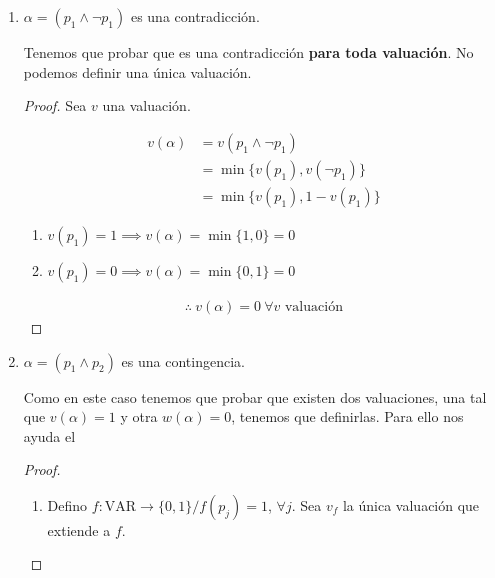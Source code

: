 \begin{enumerate}
    \item $\alpha = (p_1 \wedge \neg p_1)$ es una contradicción.

        Tenemos que probar que es una contradicción 
        \textbf{para toda valuación}. No podemos definir una única valuación.

        \begin{proof} \phantom{.}
        
            Sea $v$ una valuación.

            \begin{align*}
                v(\alpha) &= v(p_1 \wedge \neg p_1) \\
                &= \min \{ v(p_1), v(\neg p_1) \} \\
                &= \min \{ v(p_1), 1-v(p_1) \}
            \end{align*}

            \begin{enumerate}[%
                labelindent=*,
                style=multiline,
                leftmargin=*,
                align=left,
                leftmargin=2\parindent,
                label=Caso \arabic*)]
                \item $v(p_1) = 1 \implies v(\alpha) = \min \{ 1,0 \} = 0$
                \item $v(p_1) = 0 \implies v(\alpha)=\min \{ 0,1 \} = 0$
            \end{enumerate}
            \begin{gather*}
                \therefore ~ v(\alpha) = 0 ~ \forall v \text{ valuación}
            \end{gather*}
            
        \end{proof}
        
    \item $\alpha = (p_1 \wedge p_2)$ es una contingencia.

        Como en este caso tenemos que probar que existen dos valuaciones,
        una tal que $v(\alpha)=1$ y otra $w(\alpha)=0$, tenemos que 
        definirlas. Para ello nos ayuda el 


        \begin{proof} \phantom{.}
        
            \begin{enumerate}
                \item Defino $f: \mathrm{VAR} \to \{ 0,1 \}/ f(p_j) = 1$, $\forall j$.
            Sea $v_f$ la única valuación que extiende a $f$.


\end{enumerate}
\end{proof}
\end{enumerate}
